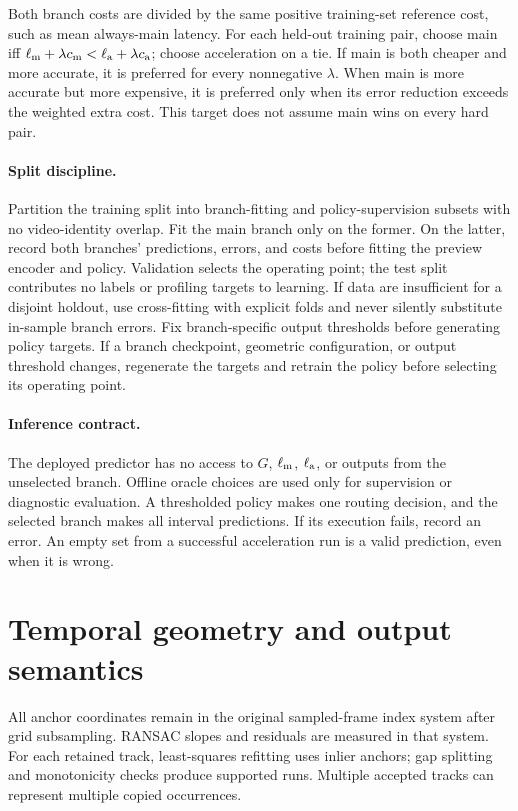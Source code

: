 \documentclass[10pt,twocolumn,letterpaper]{article}
\begin{document}
Both branch costs are divided by the same positive training-set reference cost, such as
mean always-main latency. For each held-out training pair, choose main iff
$\ell_{\rm m}+\lambda c_{\rm m}<\ell_{\rm a}+\lambda c_{\rm a}$; choose acceleration on a tie.
If main is both cheaper and more accurate, it is preferred for every nonnegative $\lambda$.
When main is more accurate but more expensive, it is preferred only when its error reduction
exceeds the weighted extra cost. This target does not assume main wins on every hard pair.

\paragraph{Split discipline.}
Partition the training split into branch-fitting and policy-supervision subsets with no
video-identity overlap. Fit the main branch only on the former. On the latter, record both
branches' predictions, errors, and costs before fitting the preview encoder and policy.
Validation selects the operating point; the test split contributes no labels or profiling
targets to learning. If data are insufficient for a disjoint holdout, use cross-fitting with
explicit folds and never silently substitute in-sample branch errors.
Fix branch-specific output thresholds before generating policy targets. If a branch
checkpoint, geometric configuration, or output threshold changes, regenerate the targets
and retrain the policy before selecting its operating point.

\paragraph{Inference contract.}
The deployed predictor has no access to $G$, $\ell_{\rm m}$, $\ell_{\rm a}$, or outputs from
the unselected branch. Offline oracle choices are used only for supervision or diagnostic
evaluation. A thresholded policy makes one routing decision, and the selected branch makes
all interval predictions. If its execution fails, record an error. An empty set from a
successful acceleration run is a valid prediction, even when it is wrong.

\section{Temporal geometry and output semantics}
All anchor coordinates remain in the original sampled-frame index system after grid
subsampling. RANSAC slopes and residuals are measured in that system. For each retained
track, least-squares refitting uses inlier anchors; gap splitting and monotonicity checks
produce supported runs. Multiple accepted tracks can represent multiple copied occurrences.
\end{document}
